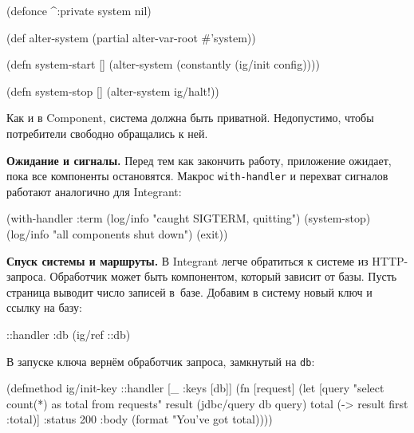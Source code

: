 \else

\begin{english}
  \begin{clojure}
(defonce ^:private system nil)

(def alter-system (partial alter-var-root #'system))

(defn system-start []
  (alter-system (constantly (ig/init config))))

(defn system-stop []
  (alter-system ig/halt!))
  \end{clojure}
\end{english}

\fi

Как и в Component, система должна быть приватной. Недопустимо, чтобы потребители
свободно обращались к ней.


\textbf{Ожидание и сигналы.} Перед тем как закончить работу, приложение ожидает,
пока все компоненты остановятся. Макрос \verb|with-handler| и перехват
сигналов работают аналогично для Integrant:

\begin{english}
  \begin{clojure}
(with-handler :term
  (log/info "caught SIGTERM, quitting")
  (system-stop)
  (log/info "all components shut down")
  (exit))
  \end{clojure}
\end{english}


\textbf{Спуск системы и маршруты.} В Integrant легче обратиться к системе из
HTTP-запроса. Обработчик может быть компонентом, который зависит от базы. Пусть
страница выводит число записей в~базе. Добавим в систему новый ключ и ссылку на
базу:

\begin{english}
  \begin{clojure}
{::handler {:db (ig/ref ::db)}}
  \end{clojure}
\end{english}

\noindent
В запуске ключа вернём обработчик запроса, замкнутый на \verb|db|:

\ifx\DEVICETYPE\MOBILE

\begin{english}
  \begin{clojure}
(defmethod ig/init-key ::handler
  [_ {:keys [db]}]
  (fn [request]
    (let [query "select count(*) as total
                 from requests"
          result (jdbc/query db query)
          total (-> result first :total)]
      {:status 200
       :body (format
               "You've got %
               total)})))
  \end{clojure}
\end{english}

